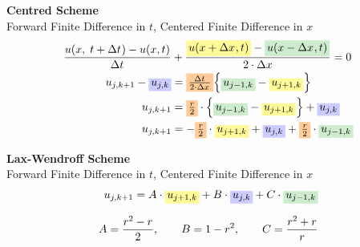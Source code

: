 \documentclass[
	final,
	a4paper,
	oneside,
	parskip=full,
	headings=standardclasses,
	headings=big,
	pointednumbers,
    fleqn
]{scrartcl}
\newcommand{\tfillb}[1]{\tfillc[#1][blue!20]}
\newcommand{\tfillo}[1]{\tfillc[#1][orange!40]}
\newcommand{\tfillg}[1]{\tfillc[#1][Green!20]}
\newcommand{\tfilly}[1]{\tfillc[#1][yellow!40]}
\newcommand{\f}[2]{\frac{#1}{#2}}
\newcommand{\fs}[2]{{\tfrac{#1}{#2}}}
\newcommand{\kl}[1]{{\left( #1 \right)}}
\newcommand{\kq}[1]{{\left\{ #1 \right\}}}
\begin{document}
    {\bf{Centred Scheme}} \\
    Forward Finite Difference in $t$, Centered Finite Difference in $x$ \\
    {\setlength{\abovedisplayskip}{-6pt}
    \setlength{\belowdisplayskip}{-12pt}
    \begin{align*}
        \f{u \kl{x,\;t + \dt} - u \kl{x, t}}{\dt} &+ \f{ \tfilly{$u \kl{x + \dx, t}$} - \tfillg{$u \kl{x - \dx, t}$}}{2 \cdot \dx} = 0 \\
        u_{j,k+1} - \tfillb{$u_{j,k}$}  &= \tfillo{${\fs{\dt}{2 \cdot \dx}}$} \kq{\tfillg{$u_{j-1,k}$} - \tfilly{$u_{j+1,k}$}} \\
        u_{j,k+1}                       &= \tfillo{$\fs{r}{2}$} \cdot \kq{\tfillg{$u_{j-1,k}$} - \tfilly{$u_{j+1,k}$}} + \tfillb{$u_{j,k}$} \\
        u_{j,k+1}                       &= - \tfillo{$\fs{r}{2}$} \cdot \tfilly{$u_{j+1,k}$} + \tfillb{$u_{j,k}$} + \tfillo{$\fs{r}{2}$}  \cdot \tfillg{$u_{j-1,k}$}
    \end{align*}}

    {\bf{Lax-Wendroff Scheme}} \\
    Forward Finite Difference in $t$, Centered Finite Difference in $x$ \\
    {\setlength{\abovedisplayskip}{-6pt}
    \setlength{\belowdisplayskip}{-12pt}
    \begin{align*}
        u_{j,k+1} = A \cdot \tfilly{$u_{j+1,k}$} + B \cdot \tfillb{$u_{j,k}$} + C \cdot \tfillg{$u_{j-1,k}$} \\[0.25cm]
        A = \f{r^2 - r}{2}, \qquad B = 1 - r^2, \qquad C = \f{r^2 + r}{r}
    \end{align*}}
    

    
\end{document}
